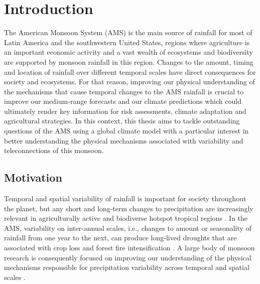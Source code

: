 

\chapter{\label{ch:1-intro}Introduction} 


The American Monsoon System (AMS) is the main source of rainfall for most of
Latin America and the southwestern United States, regions where agriculture is an important economic activity and a vast wealth of ecosystems and biodiversity are
supported by monsoon rainfall in this region. Changes to the amount, timing and location of rainfall over different temporal scales
have direct consequences for society and ecosystems.
For that reason, improving our physical understanding of the mechanisms that cause temporal changes to the AMS rainfall is crucial to improve our medium-range forecasts and our climate predictions which could ultimately render key information for risk assessments, climate adaptation and
agricultural strategies. In this context, this thesis aims to tackle outstanding questions of the AMS using a global climate model with a particular interest in better understanding
the physical mechanisms associated with variability and teleconnections of this monsoon.


\section{Motivation}

Temporal and spatial variability of rainfall is important for society throughout the planet, but any short and long-term changes to precipitation are increasingly relevant in agriculturally active and biodiverse hotspot tropical regions \citep{sultan2005,jain2015}. 
In the AMS, variability on inter-annual scales, i.e., changes to amount or seasonality of rainfall from one year to the next, can produce long-lived droughts that are associated with crop loss and forest fire intensification \citep{chen2009,harvey2018}.
A large body of monsoon research is consequently focused on improving our understanding of the physical mechanisms responsible for precipitation variability across temporal and spatial scales \citep{wang2017,gadgil2018}. 

